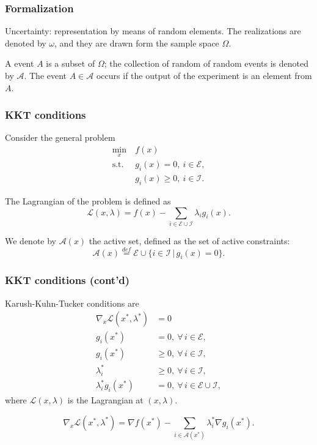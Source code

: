 \begin{frame}
\frametitle{Formalization}

Uncertainty: representation by means of {\red random elements}.
The realizations are denoted by $\omega$, and they are drawn form the sample space $\Omega$.

\mbox{}

A {\red event} $A$ is a subset of $\Omega$; the collection of random of random events is denoted by $\mathcal{A}$.
The event $A \in \mathcal{A}$ occurs if the output of the experiment is an element from $A$.

\end{frame}

\begin{frame}
\frametitle{KKT conditions}

Consider the general problem
\begin{align*}
\min_x \ & f(x) \\
\mbox{s.t. } & g_i(x) = 0, \ i \in \mathcal{E}, \\
& g_i(x) \geq 0, \ i \in \mathcal{I}.
\end{align*}

\mbox{}

The Lagrangian of the problem is defined as
\[
\mathcal{L}(x,\lambda) = f(x) - \sum_{i \in \mathcal{E} \cup \mathcal{I}} \lambda_i g_i(x).
\]

\mbox{}

We denote by $\mathcal{A}(x)$ the active set, defined as the set of active constraints:
\[
\mathcal{A}(x) \overset{def}{=} \mathcal{E} \cup \lbrace i \in \mathcal{I} \,|\, g_i(x) = 0 \rbrace.
\]
\end{frame}

\begin{frame}
\frametitle{KKT conditions (cont'd)}

Karush-Kuhn-Tucker conditions are
\begin{align*}
\nabla_x \mathcal{L}(x^*, \lambda^*) & = 0 \\
g_i(x^*) & = 0, \ \forall\, i \in \mathcal{E}, \\
g_i(x^*) & \geq 0, \ \forall\, i \in \mathcal{I}, \\
\lambda_i^* & \geq 0, \ \forall\, i \in \mathcal{I}, \\
\lambda_i^* g_i(x^*) & = 0, \ \forall\, i \in \mathcal{E} \cup \mathcal{I},
\end{align*}
where $\mathcal{L}(x, \lambda)$ is the Lagrangian at $(x, \lambda)$.

\[
\nabla_x \mathcal{L}(x^*, \lambda^*) = \nabla f(x^*) - \sum_{i \in \mathcal{A}(x^*)} \lambda_i^* \nabla g_i(x^*).
\]

\end{frame}
